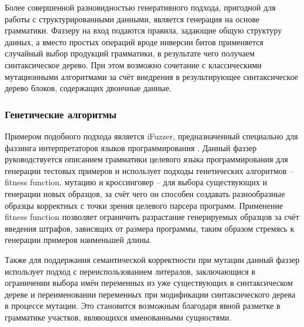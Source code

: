 Более совершенной разновидностью генеративного подхода, пригодной для работы с структурированными данными, является генерация на основе грамматики. Фаззеру на вход подаются правила, задающие общую структуру данных, а вместо простых операций вроде инверсии битов применяется случайный выбор продукций грамматики, в результате чего получаем синтаксическое дерево. При этом возможно сочетание с классическими мутационными алгоритмами за счёт внедрения в результирующее синтаксическое дерево блоков, содержащих двоичные данные.

\subsubsection{Генетические алгоритмы}


Примером подобного подхода является iFuzzer, предназначенный специально для фаззинга интерпретаторов языков программирования \cite{ifuzzer}. Данный фаззер руководствуется описанием грамматики целевого языка программирования для генерации тестовых примеров и использует подходы генетических алгоритмов -- fitness function, мутацию и кроссинговер -- для выбора существующих и генерации новых образцов, за счёт чего он способен создавать разнообразные образцы корректных с точки зрения целевого парсера программ. Применение fitness function позволяет ограничить разрастание генерируемых образцов за счёт введения штрафов, зависящих от размера программы, таким образом стремясь к генерации примеров наименьшей длины.

Также для поддержания семантической корректности при мутации данный фаззер использует подход с переиспользованием литералов, заключающися в ограничении выбора имён переменных из уже существующих в синтаксическом дереве и переименовании переменных при модификации синтаксического дерева в процессе мутации. Это становится возможным благодаря явной разметке в грамматике участков, являющихся именованными сущностями.
